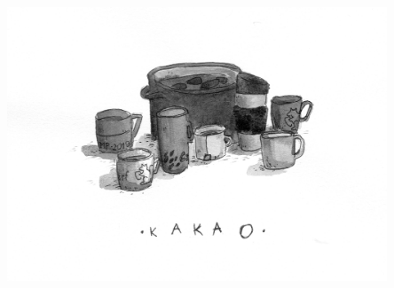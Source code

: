 \documentclass[a5paper, 10pt]{book}
\begin{document}
\includegraphics[width=0.85\textwidth, center]{images/kakao.png}\\

\newpage
\end{document}
